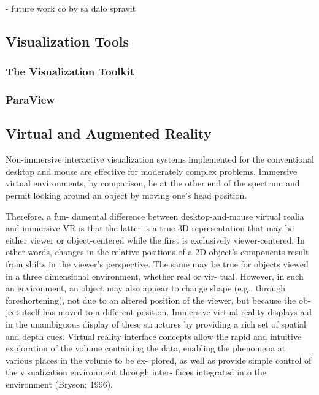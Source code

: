 - future work co by sa dalo spravit

\subsection{Visualization Tools}

\subsubsection{The Visualization Toolkit}

\subsubsection{ParaView}

\subsection{Virtual and Augmented Reality}

Non-immersive interactive visualization systems implemented for the conventional desktop and mouse are effective for moderately complex problems. Immersive virtual environments, by comparison, lie at the other end of the spectrum and permit looking around an object by moving one's head position.

Therefore, a fun- damental difference between desktop-and-mouse virtual realia and immersive VR is that the latter is a true 3D representation that may be either viewer or object-centered while the first is exclusively viewer-centered. In other words, changes in the relative positions of a 2D object’s components result from shifts in the viewer’s perspective. The same may be true for objects viewed in a three dimensional environment, whether real or vir- tual. However, in such an environment, an object may also appear to change shape (e.g., through foreshortening), not due to an altered position of the viewer, but because the ob- ject itself has moved to a different position. Immersive virtual reality displays aid in the unambiguous display of these structures by providing a rich set of spatial and depth cues. Virtual reality interface concepts allow the rapid and intuitive exploration of the volume containing the data, enabling the phenomena at various places in the volume to be ex- plored, as well as provide simple control of the visualization environment through inter- faces integrated into the environment (Bryson; 1996).

